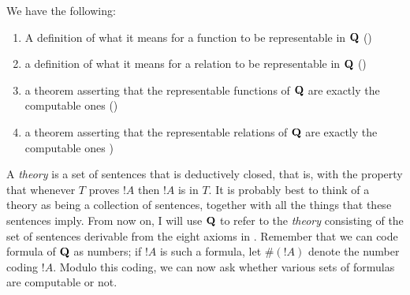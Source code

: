 \documentclass[../../include/open-logic-section]{subfiles}
\begin{document}


We have the following:
\begin{enumerate}
\item A definition of what it means for a function to be representable
  in $\mathbf{Q}$ ()
\item a definition of what it means for a relation to be representable
  in $\mathbf{Q}$ ()
\item a theorem asserting that the representable functions of $\mathbf{Q}$
  are exactly the computable ones
  ()
\item a theorem asserting that the representable relations of $\mathbf{Q}$
  are exactly the computable ones
  )
\end{enumerate}

A {\em theory} is a set of sentences that is deductively closed, that
is, with the property that whenever $T$ proves $!A$ then $!A$ is in
$T$. It is probably best to think of a theory as being a collection of
sentences, together with all the things that these sentences imply.
From now on, I will use $\mathbf{Q}$ to refer to the {\em theory}
consisting of the set of sentences derivable from the eight axioms in
.  Remember that we can code formula of $\mathbf{Q}$
as numbers; if $!A$ is such a formula, let $\#(!A)$ denote the number
coding $!A$. Modulo this coding, we can now ask whether various sets
of formulas are computable or not.
\end{document}
